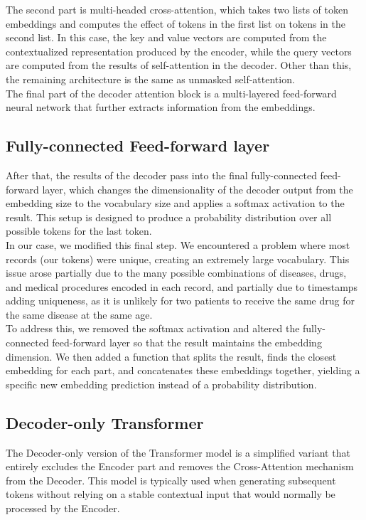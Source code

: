 The second part is multi-headed cross-attention, which takes two lists of token embeddings and computes the effect of tokens in the first list on tokens in the second list. In this case, the key and value vectors are computed from the contextualized representation produced by the encoder, while the query vectors are computed from the results of self-attention in the decoder. Other than this, the remaining architecture is the same as unmasked self-attention.
\\

The final part of the decoder attention block is a multi-layered feed-forward neural network that further extracts information from the embeddings.

\subsection{Fully-connected Feed-forward layer}

After that, the results of the decoder pass into the final fully-connected feed-forward layer, which changes the dimensionality of the decoder output from the embedding size to the vocabulary size and applies a softmax activation to the result. This setup is designed to produce a probability distribution over all possible tokens for the last token.
\\

In our case, we modified this final step. We encountered a problem where most records (our tokens) were unique, creating an extremely large vocabulary. This issue arose partially due to the many possible combinations of diseases, drugs, and medical procedures encoded in each record, and partially due to timestamps adding uniqueness, as it is unlikely for two patients to receive the same drug for the same disease at the same age.
\\

To address this, we removed the softmax activation and altered the fully-connected feed-forward layer so that the result maintains the embedding dimension. We then added a function that splits the result, finds the closest embedding for each part, and concatenates these embeddings together, yielding a specific new embedding prediction instead of a probability distribution.

\subsection{Decoder-only Transformer}

The Decoder-only version of the Transformer model is a simplified variant that entirely excludes the Encoder part and removes the Cross-Attention mechanism from the Decoder. This model is typically used when generating subsequent tokens without relying on a stable contextual input that would normally be processed by the Encoder.
\\


